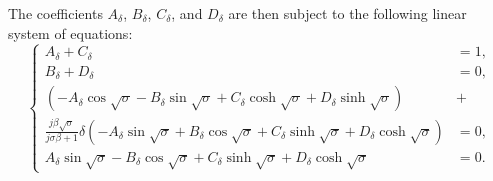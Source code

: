 \documentclass{article}
\begin{document}
The coefficients $A_\delta$, $B_\delta$, $C_\delta$, and $D_\delta$ are then subject to the following linear system of equations:
\begin{equation}
    \left\{\begin{aligned}
        A_\delta + C_\delta &= 1, \\
        B_\delta + D_\delta &= 0, \\
        \left( - A_\delta \cos{\sqrt{\sigma}} - B_\delta \sin{\sqrt{\sigma}} + C_\delta \cosh{\sqrt{\sigma}} + D_\delta \sinh{\sqrt{\sigma}} \right) &+ \\
        \frac{j \beta \sqrt{\sigma}}{ j\sigma \beta + 1 } \delta \left( - A_\delta \sin{\sqrt{\sigma}} + B_\delta \cos{\sqrt{\sigma}} + C_\delta \sinh{\sqrt{\sigma}} + D_\delta \cosh{\sqrt{\sigma}} \right) &= 0, \\
        A_\delta \sin{\sqrt{\sigma}} - B_\delta \cos{\sqrt{\sigma}} + C_\delta \sinh{\sqrt{\sigma}} + D_\delta \cosh{\sqrt{\sigma}} &= 0.
    \end{aligned}\right.
\end{equation}
\end{document}
